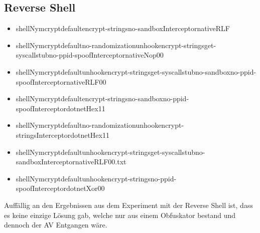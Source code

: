 \subsection{Reverse Shell}
\begin{itemize}
\item shellNymcryptdefaultencrypt-stringsno-sandboxInterceptornativeRLF
\item shellNymcryptdefaultno-randomizationunhookencrypt-stringsget-syscallstubno-ppid-spoofInterceptornativeNop00
\item shellNymcryptdefaultunhookencrypt-stringsget-syscallstubno-sandboxno-ppid-spoofInterceptornativeRLF00
\item shellNymcryptdefaultencrypt-stringsno-sandboxno-ppid-spoofInterceptordotnetHex11
\item shellNymcryptdefaultno-randomizationunhookencrypt-stringsInterceptordotnetHex11
\item shellNymcryptdefault\-unhook\-encrypt-stringsget\--syscallstubno-sandbox\-InterceptornativeRLF00.txt
\item shellNymcryptdefaultunhookencrypt-stringsno-ppid-spoofInterceptordotnetXor00
\end{itemize}
Auffällig an den Ergebnissen aus dem Experiment mit der Reverse Shell ist, dass es keine einzige Lösung gab, welche nur aus einem Obfuskator bestand und dennoch der AV Entgangen wäre.